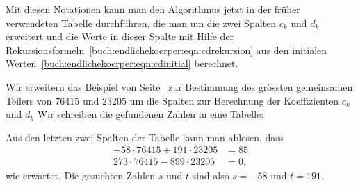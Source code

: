 Mit diesen Notationen kann man den Algorithmus jetzt in der früher
verwendeten Tabelle durchführen, die man um die zwei
Spalten $c_k$ und $d_k$ erweitert und die Werte in dieser
Spalte mit Hilfe der
Rekursionsformeln~\eqref{buch:endlichekoerper:eqn:cdrekursion}
aus den initialen Werten~\eqref{buch:endlichekoerper:eqn:cdinitial}
berechnet.

\begin{beispiel}
Wir erweitern das Beispiel von Seite~\pageref{buch:endlichekoerper:beispiel1}
zur Bestimmung des grössten gemeinsamen Teilers von $76415$ und $23205$
um die Spalten zur Berechnung der Koeffizienten $c_k$ und $d_k$
Wir schreiben die gefundenen Zahlen in eine Tabelle:
\begin{center}
\label{buch:endlichekoerper:beispiel1erweitert}
\end{center}
Aus den letzten zwei Spalten der Tabelle kann man ablesen, dass
\begin{align*}
-58\cdot 76415 + 191\cdot 23205 &= 85\\
273\cdot 76415 - 899\cdot 23205 &= 0,
\end{align*}
wie erwartet.
Die gesuchten Zahlen $s$ und $t$ sind also $s=-58$ und $t=191$.
\end{beispiel}

